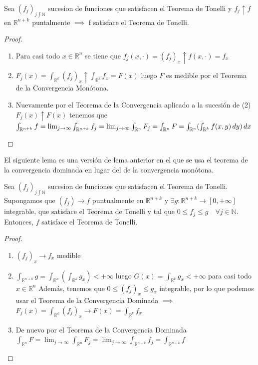 \begin{lema}
    Sea $(f_j)_{j\int\mathbb{N}}$ sucesion de funciones que satisfacen el Teorema de Tonelli y $f_j \uparrow f$ en $\mathbb{R}^{n+k}$ puntalmente $\implies$ f satisface el Teorema de Tonelli.\label{lema2Tonelli}
\end{lema}
\begin{proof}
    \leavevmode
    \begin{enumerate}
        \item Para casi todo $x \in \mathbb{R}^{n}$ se tiene que $f_j(x, \cdot) = (f_j)_x
                  \uparrow f(x, \cdot) = f_x$
        \item $F_j(x) = \int_{\mathbb{R}^k}(f_j)_x \uparrow \int_{\mathbb{R}^k}f_x = F(x)$ luego $F$ es medible por el Teorema de la Convergencia Monótona.
        \item Nuevamente por el Teorema de la Convergencia aplicado a la sucesión de (2)
              $F_j(x) \uparrow F(x)$ tenemos que $\int_{\mathbb{R}^{n+k}}f = \lim_{j \to
                      \infty} \int_{\mathbb{R}^{n+k}} f_j = \lim_{j \to \infty}\int_{\mathbb{R}^n}F_j =
                  \int_{\mathbb{R}^n}F = \int_{\mathbb{R}^n}(\int_{\mathbb{R}^k}f(x,y) \,dy)\,dx$
    \end{enumerate}
\end{proof}
\begin{observación}
El siguiente lema es una versión de lema anterior en el que se usa el teorema de la convergencia dominada en lugar del de la convergencia monótona.
\end{observación}

\begin{lema}
    Sea $(f_j)_{j\int\mathbb{N}}$ sucesion de funciones que satisfacen el Teorema de Tonelli. Supongamos que $(f_j)\to f$ puntualmente en $\mathbb{R}^{n+k}$ y $\exists g: \mathbb{R}^{n+k} \to [0, +\infty]$ integrable, que satisface el Teorema de Tonelli y tal que $ 0 \leq f_j \leq g \quad \forall j \in \mathbb{N}$. Entonces, $f$ satisface el Teorema de Tonelli.\label{lema3Tonelli}
\end{lema}
\begin{proof}
    \leavevmode
    \begin{enumerate}
        \item $(f_j)_x \to f_x$ medible
        \item $\int_{\mathbb{R}^{n+k}}g = \int_{\mathbb{R}^n}(\int_{\mathbb{R}^k}g_x) < +\infty$ luego $G(x) = \int_{\mathbb{R}^k}g_x < +\infty$ para casi todo $x \in \mathbb{R}^n$
              Además, tenemos que $0 \leq (f_j)_x \leq g_x$ integrable, por lo que podemos usar el Teorema de la Convergencia Dominada $\implies$
              $F_j(x) = \int_{\mathbb{R}^k}(f_j)_x \to F(x) = \int_{\mathbb{R}^k}f_x$
        \item De nuevo por el Teorema de la Convergencia Dominada $\int_{\mathbb{R}^n}F =
                  \lim_{j \to \infty}\int_{\mathbb{R}^n}F_j = \lim_{j \to
                      \infty}\int_{\mathbb{R}^{n+k}}f_j = \int_{\mathbb{R}^{n+k}}f$
    \end{enumerate}
\end{proof}

